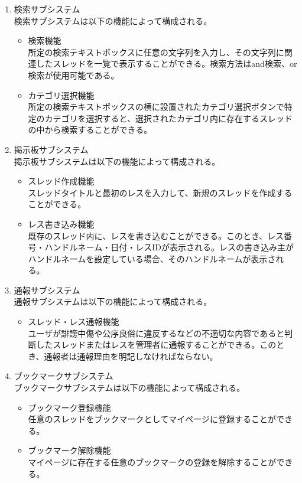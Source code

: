 \documentclass[a4j]{jarticle}
\begin{document}
\begin{enumerate}
  \item 検索サブシステム\\
  検索サブシステムは以下の機能によって構成される。
  \begin{itemize}
    \item 検索機能\\
    所定の検索テキストボックスに任意の文字列を入力し、その文字列に関連したスレッドを一覧で表示することができる。検索方法はand検索、or検索が使用可能である。
    \item カテゴリ選択機能\\
    所定の検索テキストボックスの横に設置されたカテゴリ選択ボタンで特定のカテゴリを選択すると、選択されたカテゴリ内に存在するスレッドの中から検索することができる。
  \end{itemize}

  \item 掲示板サブシステム\\
  掲示板サブシステムは以下の機能によって構成される。
  \begin{itemize}
    \item スレッド作成機能\\
    スレッドタイトルと最初のレスを入力して、新規のスレッドを作成することができる。
    \item レス書き込み機能\\
    既存のスレッド内に、レスを書き込むことができる。このとき、レス番号・ハンドルネーム・日付・レスIDが表示される。レスの書き込み主がハンドルネームを設定している場合、そのハンドルネームが表示される。
  \end{itemize}

  \item 通報サブシステム\\
  通報サブシステムは以下の機能によって構成される。
  \begin{itemize}
    \item スレッド・レス通報機能\\
    ユーザが誹謗中傷や公序良俗に違反するなどの不適切な内容であると判断したスレッドまたはレスを管理者に通報することができる。このとき、通報者は通報理由を明記しなければならない。
  \end{itemize}

  \item ブックマークサブシステム\\
  ブックマークサブシステムは以下の機能によって構成される。
  \begin{itemize}
    \item ブックマーク登録機能\\
    任意のスレッドをブックマークとしてマイページに登録することができる。
    \item ブックマーク解除機能\\
    マイページに存在する任意のブックマークの登録を解除することができる。
  \end{itemize}


\end{enumerate}
\end{document}
